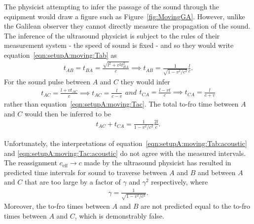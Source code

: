 \documentclass[10pt, fleqn,final,showtrims,oldfontcommands]{article} %
\newcommand{\sub}[1]{\begin{subequations}#1\end{subequations}}
\newcommand{\eqnref}[1]{\ref{eqn:#1}}
\newcommand{\figref}[1]{Figure~\ref{fig:#1}}
\newcommand{\eff}{{\textrm{eff}}}
\begin{document}
The physicist attempting to infer the passage of the sound through the equipment %
 would  draw a figure such as \figref{MovingGA}.
However, unlike the Galilean observer they cannot directly measure the propagation of the sound.
The inference of the ultrasound physicist is subject to the rules of their measurement system - 
the speed of sound is fixed - and so they would write equation~\ref{eqn:setupA:moving:Tab} as 
\begin{align}
  \label{eqn:setupA:moving:Tab:acoustic}
  t_{AB} = t_{BA} =  \frac{\sqrt{l^2+v^2t_{BA}^2}}{c} \implies t_{AB} = \frac{1}{\sqrt{1-v^2/c^2}} \frac{l}{c}.
\end{align}
For the sound pulse between $A$ and $C$  they would infer
\sub{
\label{eqn:setupA:moving:Tac:acoustic}
\begin{align}
 t_{AC} =  \frac{l+vt_{AC}}{c}\implies t_{AC} = \frac{l}{c-v}
\end{align}
and 
\begin{align}
 t_{CA} =  \frac{l-vt}{c} \implies t_{CA} = \frac{l}{c+v}
\end{align}
}
rather than  equation~\ref{eqn:setupA:moving:Tac}.
The total to-fro time between $A$ and $C$ would then be inferred to be
\begin{align}
t_{AC}+t_{CA} = \frac{1}{{1-v^2/c^2}} \frac{2l}{c}.
\end{align}

Unfortunately, the interpretations of equation~\ref{eqn:setupA:moving:Tab:acoustic} and \ref{eqn:setupA:moving:Tac:acoustic} do not agree with the measured intervals.
The reassignment $c_\eff \rightarrow c$ made by the ultrasound physicist 
has resulted in predicted time intervals for sound to traverse between $A$ and $B$ and between $A$ and $C$ that are too large
by a factor of $\gamma$ and $\gamma^2$ respectively,
where 
\begin{align}
  \gamma = \frac{1}{\sqrt{1-v^2/c^2}}.
\end{align}
Moreover, the to-fro times between $A$ and $B$ are not predicted equal to the to-fro times between $A$ and $C$,
which is demonstrably false.
\end{document}
